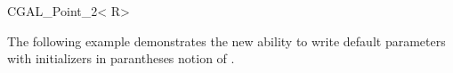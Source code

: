 \begin{ccClassTemplate}{CGAL_Point_2< R>}

The following example demonstrates the new ability to write default
parameters with initializers in parantheses notion of \CC.

\end{ccClassTemplate}



